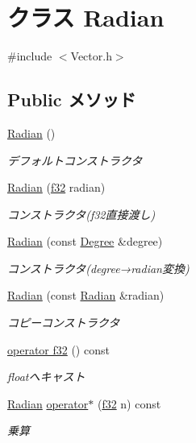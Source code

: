 \hypertarget{class_radian}{\section{クラス Radian}
\label{class_radian}
}


{\ttfamily \#include $<$Vector.\-h$>$}

\subsection*{Public メソッド}
\begin{DoxyCompactItemize}
\item 
\hyperlink{class_radian_ab94d81eb1567cfebc60f7aec3be551ec}{Radian} ()
\begin{DoxyCompactList}\small\item\em デフォルトコンストラクタ \end{DoxyCompactList}\item 
\hyperlink{class_radian_a90a4efa6b5179babdbb7d1a319ebbee9}{Radian} (\hyperlink{_main_8h_a5f6906312a689f27d70e9d086649d3fd}{f32} radian)
\begin{DoxyCompactList}\small\item\em コンストラクタ(f32直接渡し) \end{DoxyCompactList}\item 
\hyperlink{class_radian_aadc2c910541b98af5b2b8f3def18a83b}{Radian} (const \hyperlink{class_degree}{Degree} \&degree)
\begin{DoxyCompactList}\small\item\em コンストラクタ(degree→radian変換) \end{DoxyCompactList}\item 
\hyperlink{class_radian_a7a2edb4be829c47af52db5b1b5739a7f}{Radian} (const \hyperlink{class_radian}{Radian} \&radian)
\begin{DoxyCompactList}\small\item\em コピーコンストラクタ \end{DoxyCompactList}\item 
\hyperlink{class_radian_a309c93566adef5d406c0f56be7a5ffc8}{operator f32} () const 
\begin{DoxyCompactList}\small\item\em floatへキャスト \end{DoxyCompactList}\item 
\hyperlink{class_radian}{Radian} \hyperlink{class_radian_a084d047a0f0c9af0edd9b80d1434ed08}{operator$\ast$} (\hyperlink{_main_8h_a5f6906312a689f27d70e9d086649d3fd}{f32} n) const 
\begin{DoxyCompactList}\small\item\em 乗算 \end{DoxyCompactList}\end{DoxyCompactItemize}
